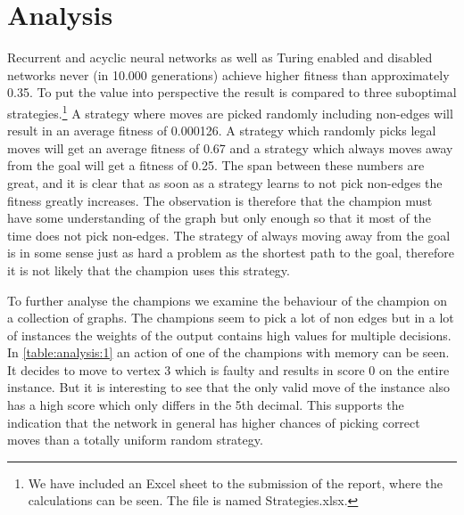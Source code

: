 
\section{Analysis}
Recurrent and acyclic neural networks as well as Turing enabled and disabled networks never (in 10.000 generations) achieve higher fitness than approximately 0.35. To put the value into perspective the result is compared to three suboptimal strategies.\footnote{We have included an Excel sheet to the submission of the report, where the calculations can be seen. The file is named Strategies.xlsx.} A strategy where moves are picked randomly including non-edges will result in an average fitness of 0.000126. A strategy which randomly picks legal moves will get an average fitness of 0.67 and a strategy which always moves away from the goal will get a fitness of 0.25. The span between these numbers are great, and it is clear that as soon as a strategy learns to not pick non-edges the fitness greatly increases. The observation is therefore that the champion must have some understanding of the graph but only enough so that it most of the time does not pick non-edges. The strategy of always moving away from the goal is in some sense just as hard a problem as the shortest path to the goal, therefore it is not likely that the champion uses this strategy. 

\newpar To further analyse the champions we examine the behaviour of the champion on a collection of graphs. The champions seem to pick a lot of non edges but in a lot of instances the weights of the output contains high values for multiple decisions. In \autoref{table:analysis:1} an action of one of the champions with memory can be seen. It decides to move to vertex 3 which is faulty and results in score 0 on the entire instance. But it is interesting to see that the only valid move of the instance also has a high score which only differs in the 5th decimal. This supports the indication that the network in general has higher chances of picking correct moves than a totally uniform random strategy.

